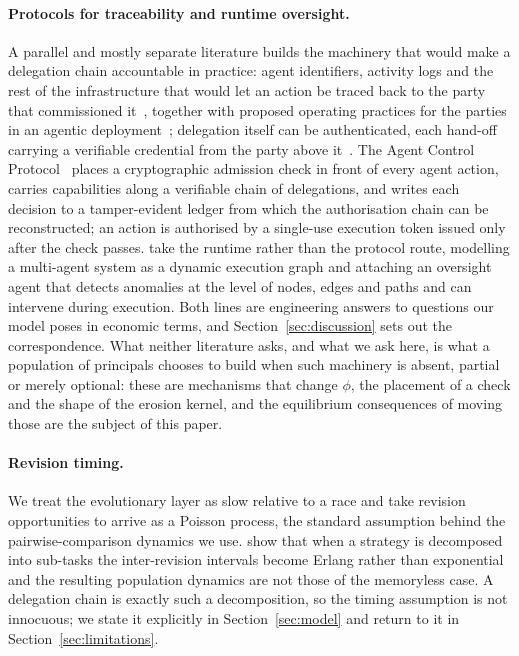 \documentclass[11pt,a4paper]{article}
\theoremstyle{definition}
\begin{document}
\paragraph{Protocols for traceability and runtime oversight.}
A parallel and mostly separate literature builds the machinery that would make
a delegation chain accountable in practice: agent identifiers, activity logs
and the rest of the infrastructure that would let an action be traced back to
the party that commissioned
it~\citep{chan2024visibility,chan2024ids,chan2025infrastructure}, together
with proposed operating practices for the parties in an agentic
deployment~\citep{shavit2023practices}; delegation itself can be
authenticated, each hand-off carrying a verifiable credential from the party
above it~\citep{south2025authenticated}. The Agent Control
Protocol~\citep{fernandez2026acp} places a cryptographic admission check in
front of every agent action, carries capabilities along a verifiable chain of
delegations, and writes each decision to a tamper-evident ledger from which the
authorisation chain can be reconstructed; an action is authorised by a
single-use execution token issued only after the check passes.
\citet{he2025sentinelagent} take the runtime rather than the protocol route,
modelling a multi-agent system as a dynamic execution graph and attaching an
oversight agent that detects anomalies at the level of nodes, edges and paths
and can intervene during execution. Both lines are engineering answers to
questions our model poses in economic terms, and
Section~\ref{sec:discussion} sets out the correspondence. What neither
literature asks, and what we ask here, is what a population of principals
chooses to build when such machinery is absent, partial or merely optional:
these are mechanisms that change $\phi$, the placement of a check and the shape
of the erosion kernel, and the equilibrium consequences of moving those are the
subject of this paper.

\paragraph{Revision timing.}
We treat the evolutionary layer as slow relative to a race and take revision
opportunities to arrive as a Poisson process, the standard assumption behind
the pairwise-comparison dynamics we use. \citet{kara2022erlang} show that when a
strategy is decomposed into sub-tasks the inter-revision intervals become
Erlang rather than exponential and the resulting population dynamics are not
those of the memoryless case. A delegation chain is exactly such a
decomposition, so the timing assumption is not innocuous; we state it
explicitly in Section~\ref{sec:model} and return to it in
Section~\ref{sec:limitations}.
\end{document}
